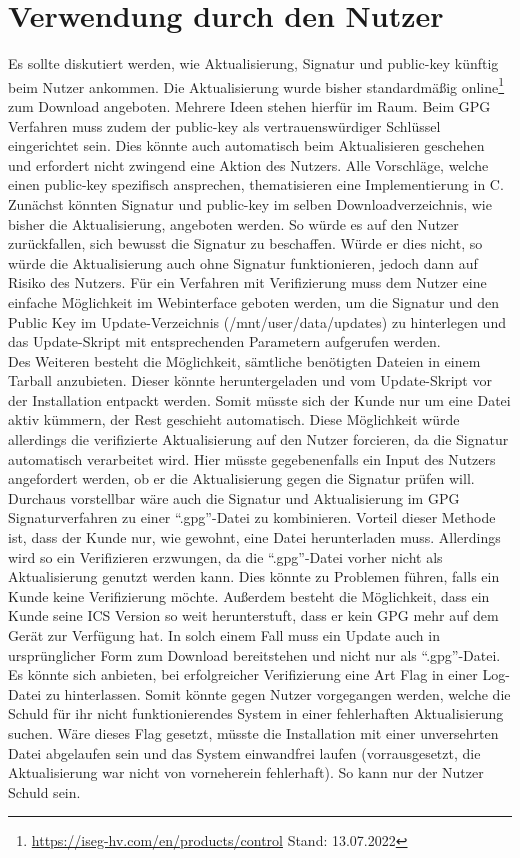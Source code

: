 \documentclass[thesis=bachelor,faculty=cb]{hsmw-thesis}
\begin{document}
{\section{Verwendung durch den Nutzer}
Es sollte diskutiert werden, wie Aktualisierung, Signatur und public-key künftig beim Nutzer ankommen. Die Aktualisierung wurde bisher standardmäßig online\footnote{\url{https://iseg-hv.com/en/products/control} Stand: 13.07.2022} zum Download angeboten. Mehrere Ideen stehen hierfür im Raum. Beim GPG Verfahren muss zudem der public-key als vertrauenswürdiger Schlüssel eingerichtet sein. Dies könnte auch automatisch beim Aktualisieren geschehen und erfordert nicht zwingend eine Aktion des Nutzers. Alle Vorschläge, welche einen public-key spezifisch ansprechen, thematisieren eine Implementierung in C.
\\[1cm]
Zunächst könnten Signatur und public-key im selben Downloadverzeichnis, wie bisher die Aktualisierung, angeboten werden. So würde es auf den Nutzer zurückfallen, sich bewusst die Signatur zu beschaffen. Würde er dies nicht, so würde die Aktualisierung auch ohne Signatur funktionieren, jedoch dann auf Risiko des Nutzers. Für ein Verfahren mit Verifizierung muss dem Nutzer eine einfache Möglichkeit im Webinterface geboten werden, um die Signatur und den Public Key im Update-Verzeichnis (/mnt/user/data/updates) zu hinterlegen und das Update-Skript mit entsprechenden Parametern aufgerufen werden.
\\[1cm]
Des Weiteren besteht die Möglichkeit, sämtliche benötigten Dateien in einem Tarball anzubieten. Dieser könnte heruntergeladen und vom Update-Skript vor der Installation entpackt werden. Somit müsste sich der Kunde nur um eine Datei aktiv kümmern, der Rest geschieht automatisch. Diese Möglichkeit würde allerdings die verifizierte Aktualisierung auf den Nutzer forcieren, da die Signatur automatisch verarbeitet wird. Hier müsste gegebenenfalls ein Input des Nutzers angefordert werden, ob er die Aktualisierung gegen die Signatur prüfen will.
\\[1cm]
Durchaus vorstellbar wäre auch die Signatur und Aktualisierung im GPG Signaturverfahren zu einer \enquote{.gpg}-Datei zu kombinieren. Vorteil dieser Methode ist, dass der Kunde nur, wie gewohnt, eine Datei herunterladen muss. Allerdings wird so ein Verifizieren erzwungen, da die \enquote{.gpg}-Datei vorher nicht als Aktualisierung genutzt werden kann. Dies könnte zu Problemen führen, falls ein Kunde keine Verifizierung möchte. Außerdem besteht die Möglichkeit, dass ein Kunde seine ICS Version so weit herunterstuft, dass er kein GPG mehr auf dem Gerät zur Verfügung hat. In solch einem Fall muss ein Update auch in ursprünglicher Form zum Download bereitstehen und nicht nur als \enquote{.gpg}-Datei.
\\[1cm]
Es könnte sich anbieten, bei erfolgreicher Verifizierung eine Art Flag in einer Log-Datei zu hinterlassen. Somit könnte gegen Nutzer vorgegangen werden, welche die Schuld für ihr nicht funktionierendes System in einer fehlerhaften Aktualisierung suchen. Wäre dieses Flag gesetzt, müsste die Installation mit einer unversehrten Datei abgelaufen sein und das System einwandfrei laufen (vorrausgesetzt, die Aktualisierung war nicht von vorneherein fehlerhaft).
So kann nur der Nutzer Schuld sein.
}
\end{document}
